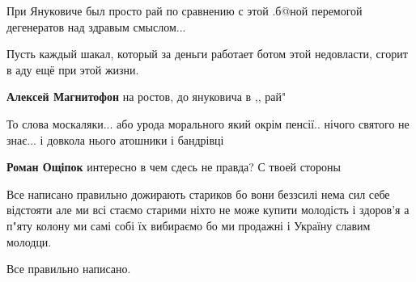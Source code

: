 \begin{itemize}


При Януковиче был просто рай по сравнению с этой .б@ной перемогой дегенератов
над здравым смыслом...

Пусть каждый шакал, который за деньги работает ботом этой недовласти, сгорит в
аду ещё при этой жизни.

\begin{itemize}
 
\textbf{Алексей Магнитофон} на ростов, до януковича в ,, рай"
\end{itemize}

 
То слова москаляки... або урода морального який окрім пенсії.. нічого святого не
знає... і довкола нього атошники і бандрівці

\begin{itemize}

 
\textbf{Роман Ощіпок} интересно в чем сдесь не правда? С твоей стороны
\end{itemize}


Все написано правильно дожирають стариков бо вони беззсилі нема сил себе
відстояти але ми всі стаємо старими ніхто не може купити молодість і здоров'я а
п"яту колону ми самі собі їх вибираємо бо ми продажні і Україну славим молодци.

Все правильно написано.

\end{itemize}

